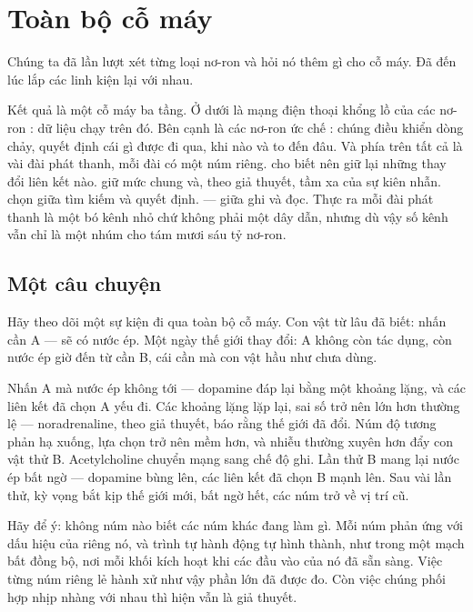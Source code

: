 \chapter{Toàn bộ cỗ máy}


Chúng ta đã lần lượt xét từng loại nơ-ron và hỏi nó thêm gì cho cỗ máy. Đã đến lúc lắp các linh kiện lại với nhau.

Kết quả là một cỗ máy ba tầng. Ở dưới là mạng điện thoại khổng lồ của các nơ-ron : dữ liệu chạy trên đó. Bên cạnh là các nơ-ron ức chế : chúng điều khiển dòng chảy, quyết định cái gì được đi qua, khi nào và to đến đâu. Và phía trên tất cả là vài đài phát thanh, mỗi đài có một núm riêng.  cho biết nên giữ lại những thay đổi liên kết nào.  giữ mức chung và, theo giả thuyết, tầm xa của sự kiên nhẫn.  chọn giữa tìm kiếm và quyết định.  --- giữa ghi và đọc. Thực ra mỗi đài phát thanh là một bó kênh nhỏ chứ không phải một dây dẫn, nhưng dù vậy số kênh vẫn chỉ là một nhúm cho tám mươi sáu tỷ nơ-ron.

\section*{Một câu chuyện}

Hãy theo dõi một sự kiện đi qua toàn bộ cỗ máy. Con vật từ lâu đã biết: nhấn cần A --- sẽ có nước ép. Một ngày thế giới thay đổi: A không còn tác dụng, còn nước ép giờ đến từ cần B, cái cần mà con vật hầu như chưa dùng.

Nhấn A mà nước ép không tới --- dopamine đáp lại bằng một khoảng lặng, và các liên kết đã chọn A yếu đi. Các khoảng lặng lặp lại, sai số trở nên lớn hơn thường lệ --- noradrenaline, theo giả thuyết, báo rằng thế giới đã đổi. Núm độ tương phản hạ xuống, lựa chọn trở nên mềm hơn, và nhiễu thường xuyên hơn đẩy con vật thử B. Acetylcholine chuyển mạng sang chế độ ghi. Lần thử B mang lại nước ép bất ngờ --- dopamine bùng lên, các liên kết đã chọn B mạnh lên. Sau vài lần thử, kỳ vọng bắt kịp thế giới mới, bất ngờ hết, các núm trở về vị trí cũ.

Hãy để ý: không núm nào biết các núm khác đang làm gì. Mỗi núm phản ứng với dấu hiệu của riêng nó, và trình tự hành động tự hình thành, như trong một mạch bất đồng bộ, nơi mỗi khối kích hoạt khi các đầu vào của nó đã sẵn sàng. Việc từng núm riêng lẻ hành xử như vậy phần lớn đã được đo. Còn việc chúng phối hợp nhịp nhàng với nhau thì hiện vẫn là giả thuyết.

